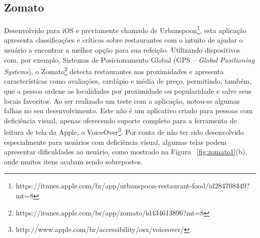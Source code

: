 \subsection{\label{subsec:zomato}Zomato}
Desenvolvido para iOS e previamente chamado de Urbanspoon\footnote{https://itunes.apple.com/br/app/urbanspoon-restaurant-food/id284708449?mt=8},  esta aplicação apresenta classificações e críticas sobre restaurantes com o intuito de ajudar o usuário a encontrar a melhor opção para sua refeição. Utilizando dispositivos com, por exemplo, Sistemas de Posicionamento Global (GPS -- \emph{Global Positioning Systems}), o Zomato\footnote{https://itunes.apple.com/br/app/zomato/id434613896?mt=8} detecta restaurantes nas proximidades e apresenta características como avaliações, cardápio e média de preço, permitindo, também, que a pessoa ordene as localidades por proximidade ou popularidade e salve seus locais favoritos. Ao ser realizado um teste com a aplicação, notou-se algumas falhas no seu desenvolvimento. Este não é um aplicativo criado para pessoas com deficiência visual, apenas oferecendo suporte completo para a ferramenta de leitura de tela da Apple, o VoiceOver\footnote{http://www.apple.com/br/accessibility/osx/voiceover/}. Por conta de não ter sido desenvolvido especialmente para usuários com deficiência visual, algumas telas podem apresentar dificuldades ao usuário, como mostrado na Figura ~\ref{fig:zomato1}(b), onde muitos itens acabam sendo sobrepostos.

